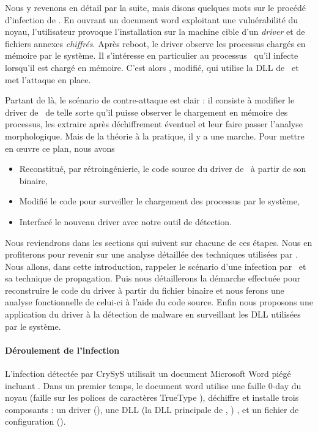 Nous y revenons en détail par la suite, mais disons quelques mots sur le procédé d'infection de \Duqu. En ouvrant un document {\sc word} exploitant une vulnérabilité du noyau, l'utilisateur provoque l'installation sur la machine cible d'un \emph{driver} et de fichiers annexes \emph{chiffrés}. %
Après reboot, le driver observe les processus chargés en mémoire par le système. Il s'intéresse en particulier au processus \service\ qu'il infecte lorsqu'il est chargé en mémoire. C'est alors \service, modifié, qui utilise la DLL de \Duqu\ et met l'attaque en place.

Partant de là, le scénario de contre-attaque est clair : il consiste à modifier le driver de \Duqu\ de telle sorte qu'il puisse observer le chargement en mémoire des processus, les extraire après déchiffrement éventuel et leur faire passer l'analyse morphologique. Mais de la théorie à la pratique, il y a une marche. Pour mettre en \oe uvre ce plan, nous avons 
\begin{itemize}
\item Reconstitué, par rétroingénierie, le code source du driver de \Duqu\ à partir de son binaire,  
\item Modifié le code pour surveiller le chargement des processus par le système,
\item Interfacé le nouveau driver avec notre outil de détection.
\end{itemize}

Nous reviendrons dans les sections qui suivent sur chacune de ces étapes. Nous en profiterons pour revenir sur une analyse détaillée des techniques utilisées par \Duqu. Nous allons, dans cette introduction, rappeler le scénario d'une infection par \Duqu\ et sa technique de propagation. Puis nous détaillerons la démarche effectuée pour reconstruire le code du driver à partir du fichier binaire et nous ferons une analyse fonctionnelle de celui-ci à l'aide du code source. Enfin nous proposons une application du driver à la détection de malware en surveillant les DLL utilisées par le système.


\paragraph{Déroulement de l'infection}
L'infection détectée par CrySyS utilisait un document Microsoft Word piégé incluant \Duqu.
Dans un premier temps, le document word utilise une faille $0$-day du noyau (faille sur les polices de caractères TrueType \cite{AThierry_CVETrueType}), déchiffre et installe trois composants : 
un driver (\driver), 
une DLL (la DLL principale de \Duqu, \netpDLL) , 
et un fichier de configuration (\netpCONF). 


